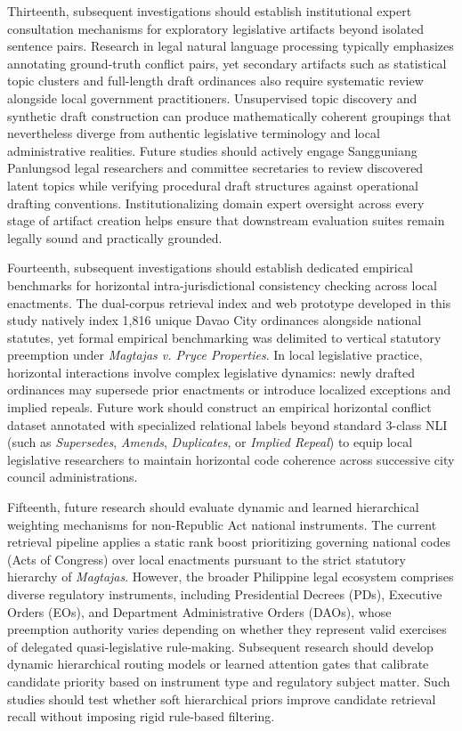 Thirteenth, subsequent investigations should establish institutional expert consultation mechanisms for exploratory legislative artifacts beyond isolated sentence pairs. Research in legal natural language processing typically emphasizes annotating ground-truth conflict pairs, yet secondary artifacts such as statistical topic clusters and full-length draft ordinances also require systematic review alongside local government practitioners. Unsupervised topic discovery and synthetic draft construction can produce mathematically coherent groupings that nevertheless diverge from authentic legislative terminology and local administrative realities. Future studies should actively engage Sangguniang Panlungsod legal researchers and committee secretaries to review discovered latent topics while verifying procedural draft structures against operational drafting conventions. Institutionalizing domain expert oversight across every stage of artifact creation helps ensure that downstream evaluation suites remain legally sound and practically grounded.

Fourteenth, subsequent investigations should establish dedicated empirical benchmarks for horizontal intra-jurisdictional consistency checking across local enactments. The dual-corpus retrieval index and web prototype developed in this study natively index 1,816 unique Davao City ordinances alongside national statutes, yet formal empirical benchmarking was delimited to vertical statutory preemption under \textit{Magtajas v. Pryce Properties}. In local legislative practice, horizontal interactions involve complex legislative dynamics: newly drafted ordinances may supersede prior enactments or introduce localized exceptions and implied repeals. Future work should construct an empirical horizontal conflict dataset annotated with specialized relational labels beyond standard 3-class NLI (such as \textit{Supersedes}, \textit{Amends}, \textit{Duplicates}, or \textit{Implied Repeal}) to equip local legislative researchers to maintain horizontal code coherence across successive city council administrations.

Fifteenth, future research should evaluate dynamic and learned hierarchical weighting mechanisms for non-Republic Act national instruments. The current retrieval pipeline applies a static rank boost prioritizing governing national codes (Acts of Congress) over local enactments pursuant to the strict statutory hierarchy of \textit{Magtajas}. However, the broader Philippine legal ecosystem comprises diverse regulatory instruments, including Presidential Decrees (PDs), Executive Orders (EOs), and Department Administrative Orders (DAOs), whose preemption authority varies depending on whether they represent valid exercises of delegated quasi-legislative rule-making. Subsequent research should develop dynamic hierarchical routing models or learned attention gates that calibrate candidate priority based on instrument type and regulatory subject matter. Such studies should test whether soft hierarchical priors improve candidate retrieval recall without imposing rigid rule-based filtering.

